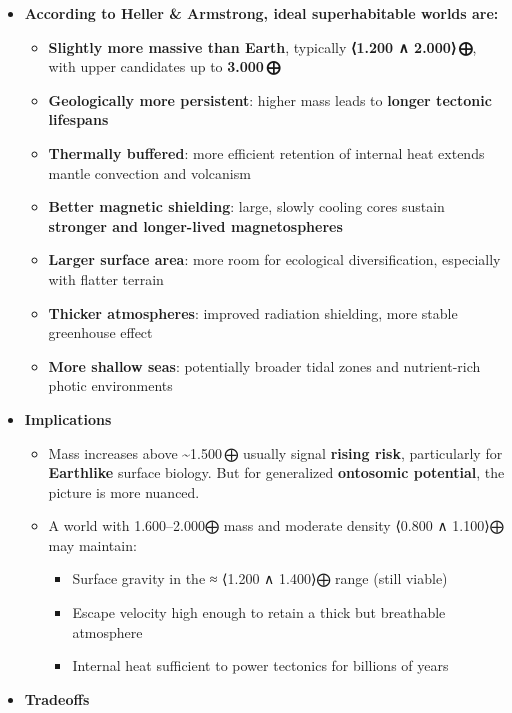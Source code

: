 \documentclass[
  letterpaper,
]{book}
\providecommand{\tightlist}{%
  \setlength{\itemsep}{0pt}\setlength{\parskip}{0pt}}
\begin{document}
\begin{itemize}
\tightlist
\item
  \textbf{According to Heller \& Armstrong, ideal superhabitable worlds
  are:}

  \begin{itemize}
  \tightlist
  \item
    \textbf{Slightly more massive than Earth}, typically \textbf{⟨1.200
    ∧ 2.000⟩\,⨁}, with upper candidates up to \textbf{3.000\,⨁}\\
  \item
    \textbf{Geologically more persistent}: higher mass leads to
    \textbf{longer tectonic lifespans}\\
  \item
    \textbf{Thermally buffered}: more efficient retention of internal
    heat extends mantle convection and volcanism\\
  \item
    \textbf{Better magnetic shielding}: large, slowly cooling cores
    sustain \textbf{stronger and longer-lived magnetospheres}\\
  \item
    \textbf{Larger surface area}: more room for ecological
    diversification, especially with flatter terrain\\
  \item
    \textbf{Thicker atmospheres}: improved radiation shielding, more
    stable greenhouse effect\\
  \item
    \textbf{More shallow seas}: potentially broader tidal zones and
    nutrient-rich photic environments
  \end{itemize}
\item
  \textbf{Implications}

  \begin{itemize}
  \tightlist
  \item
    Mass increases above \textasciitilde1.500\,⨁ usually signal
    \textbf{rising risk}, particularly for \textbf{Earthlike} surface
    biology. But for generalized \textbf{ontosomic potential}, the
    picture is more nuanced.
  \item
    A world with 1.600--2.000⨁ mass and moderate density ⟨0.800 ∧
    1.100⟩⨁ may maintain:

    \begin{itemize}
    \tightlist
    \item
      Surface gravity in the ≈ ⟨1.200 ∧ 1.400⟩⨁ range (still viable)
    \item
      Escape velocity high enough to retain a thick but breathable
      atmosphere
    \item
      Internal heat sufficient to power tectonics for billions of years
    \end{itemize}
  \end{itemize}
\item
  \textbf{Tradeoffs}


\end{itemize}
\end{document}
